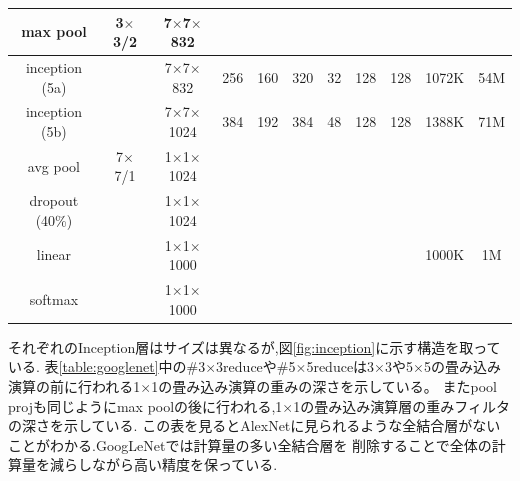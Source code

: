 {\begin{table}[p]
\begin{center}
\begin{tabular}{|c|c|c|c|c|c|c|c|c|c|c|}
  max pool       & 3$\times$3/2 & 7$\times$7$\times$832 &  &  &  &  &  &  &  &  \\ \hline
  inception (5a) &  & 7$\times$7$\times$832 & 256 & 160 & 320 & 32 & 128 & 128 & 1072K & 54M \\ \hline
  inception (5b) &  & 7$\times$7$\times$1024 & 384 & 192 & 384 & 48 & 128 & 128 & 1388K & 71M \\ \hline
  avg pool       & 7$\times$7/1 & 1$\times$1$\times$1024 &  &  &  &  &  &  &  &  \\ \hline
  dropout (40\%) &  & 1$\times$1$\times$1024 &  &  &  &  &  &  &  &  \\ \hline
  linear         &  & 1$\times$1$\times$1000 &  &  &  &  &  &  & 1000K & 1M \\ \hline
  softmax        &  & 1$\times$1$\times$1000 &  &  &  &  &  &  &  &  \\ \hline
  \end{tabular}
  \end{center}
\end{table}
  
それぞれのInception層はサイズは異なるが,図\ref{fig:inception}に示す構造を取っている.
表\ref{table:googlenet}中の\#3$\times$3reduceや\#5$\times$5reduceは3$\times$3や5$\times$5の畳み込み演算の前に行われる1$\times$1の畳み込み演算の重みの深さを示している。
またpool projも同じようにmax poolの後に行われる,1$\times$1の畳み込み演算層の重みフィルタの深さを示している.
この表を見るとAlexNetに見られるような全結合層がないことがわかる.GoogLeNetでは計算量の多い全結合層を
削除することで全体の計算量を減らしながら高い精度を保っている.
}